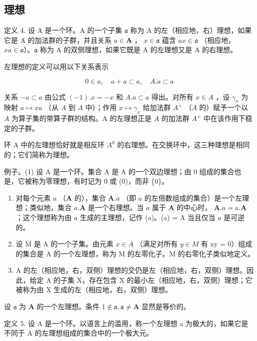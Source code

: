 \subsection{理想}

定义 4. 设 A 是一个环。A 的一个子集 \(\mathfrak{a}\) 称为 A 的左（相应地，右）理想，如果它是 A 的加法群的子群，并且关系 \(a \in \mathbf{A}\) ， \(x \in \mathfrak{a}\) 蕴含 \(ax \in \mathfrak{a}\) （相应地， \(xa \in \mathfrak{a}\)）。\(\mathfrak{a}\) 称为 A 的双侧理想，如果它既是 A 的左理想又是 A 的右理想。

左理想的定义可以用以下关系表示

\[
0 \in a, \quad a + a \subset a, \quad A. a \subset a
\]

关系 \(-a \subset a\) 由公式 \((-1).x = -x\) 和 \(A.a \subset a\) 得出。对所有 \(x \in A\) ，设 \(\gamma_x\) 为映射 \(a \mapsto xa\) （从 \(A\) 到 \(A\) 中）；作用 \(x \mapsto \gamma_x\) 给加法群 \(A^+\) （\(A\) 的）赋予一个以 \(A\) 为算子集的带算子群的结构。A 的左理想正是 \(A\) 的加法群 \(A^+\) 中在该作用下稳定的子群。

环 A 中的左理想恰好就是相反环 \(A^{0}\) 的右理想。在交换环中，这三种理想是相同的；它们简称为理想。

例子。(1) 设 A 是一个环。集合 A 是 A 的一个双边理想；由 0 组成的集合也是，它被称为零理想，有时记为 0 或 (0)，而非 \{0\}。

\begin{enumerate}
\def\labelenumi{(\arabic{enumi})}
\setcounter{enumi}{1}
\item
  对每个元素 \(a\) （\(\mathbf{A}\) 的），集合 \(\mathbf{A}.a\) （即 \(a\) 的左倍数组成的集合）是一个左理想；类似地，集合 \(a.\mathbf{A}\) 是一个右理想。当 \(a\) 属于 \(\mathbf{A}\) 的中心时， \(\mathbf{A}.a = a.\mathbf{A}\) ；这个理想称为由 \(a\) 生成的主理想，记作 (a)。(a) = A 当且仅当 \(a\) 是可逆的。
\item
  设 M 是 A 的一个子集。由元素 \(x \in A\) （满足对所有 \(y \in M\) 有 xy = 0）组成的集合是 A 的一个左理想，称为 M 的左零化子。M 的右零化子类似地定义。
\item
  A 的左（相应地，右，双侧）理想的交仍是左（相应地，右，双侧）理想。因此，给定 A 的子集 X，存在包含 X 的最小左（相应地，右，双侧）理想；它被称为由 X 生成的左（相应地，右，双侧）理想。
\end{enumerate}

设 \(\mathfrak{a}\) 为 \(\mathbf{A}\) 的一个左理想。条件 \(1 \notin \mathfrak{a}, \mathfrak{a} \neq \mathbf{A}\) 显然是等价的。

定义 5. 设 A 是一个环。以语言上的滥用，称一个左理想 a 为极大的，如果它是不同于 A 的左理想组成的集合中的一个极大元。

